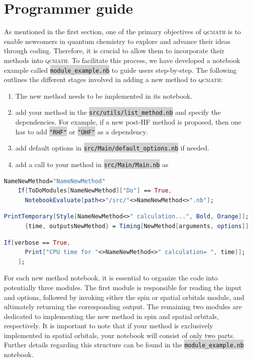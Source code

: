 \documentclass[aip,jcp,reprint,noshowkeys,superscriptaddress]{revtex4-1}
\newcommand{\qcmath}{\textsc{qcmath}\xspace}
\newcommand{\keyword}[1]{{\colorbox{lightgray}{\texttt{#1}}}}
\begin{document}
\section{Programmer guide}
As mentioned in the first section, one of the primary objectives of \qcmath is to enable newcomers in quantum chemistry to explore and advance their ideas through coding. Therefore, it is crucial to allow them to incorporate their methods into \qcmath. To facilitate this process, we have developed a notebook example called \keyword{module\_example.nb} to guide users step-by-step. The following outlines the different stages involved in adding a new method to \qcmath:
\begin{enumerate}
	\item The new method needs to be implemented in its notebook.
	\item add your method in the \keyword{src/utils/list\_method.nb} and specify the dependencies. For example, if a new post-HF method is proposed, then one has to add \keyword{"RHF"} or \keyword{"UHF"} as a dependency.
	\item add default options in \keyword{src/Main/default\_options.nb} if needed.
	\item add a call to your method in \keyword{src/Main/Main.nb} as
\end{enumerate}
\begin{lstlisting}[extendedchars=true,language=Mathematica]
	NameNewMethod="NameNewMethod"
	If[ToDoModules[NameNewMethod]["Do"] == True,
	  NotebookEvaluate[path<>"/src/"<>NameNewMethod<>".nb"];
\end{lstlisting}
\begin{lstlisting}[extendedchars=true,language=Mathematica]
	PrintTemporary[Style[NameNewMethod<>" calculation...", Bold, Orange]];
	  {time, outputsNewMethod} = Timing[NewMethod[arguments, options]];	
\end{lstlisting}
\begin{lstlisting}[extendedchars=true,language=Mathematica]
	If[verbose == True, 
	  Print["CPU time for "<>NameNewMethod<>" calculation= ", time]];
	];
\end{lstlisting}
For each new method notebook, it is essential to organize the code into potentially three modules. The first module is responsible for reading the input and options, followed by invoking either the spin or spatial orbitals module, and ultimately returning the corresponding output. The remaining two modules are dedicated to implementing the new method in spin and spatial orbitals, respectively. It is important to note that if your method is exclusively implemented in spatial orbitals, your notebook will consist of only two parts. Further details regarding this structure can be found in the \keyword{module\_example.nb} notebook.
\end{document}
